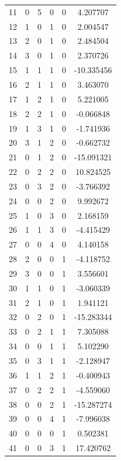 \documentclass[preprint,12pt]{elsarticle}
\begin{document}
\begin{table}
\begin{minipage}[!h]{0.25\textwidth}
{\begin{tabular}{|c|cccc|c|}
11  &   0 &   5 &   0 &   0 &    4.207707 \\
12  &   1 &   0 &   1 &   0 &    2.004547 \\
13  &   2 &   0 &   1 &   0 &    2.484504 \\
14  &   3 &   0 &   1 &   0 &    2.370726 \\
15  &   1 &   1 &   1 &   0 &  -10.335456 \\
16  &   2 &   1 &   1 &   0 &    3.463070 \\
17  &   1 &   2 &   1 &   0 &    5.221005 \\
18  &   2 &   2 &   1 &   0 &   -0.066848 \\
19  &   1 &   3 &   1 &   0 &   -1.741936 \\
20  &   3 &   1 &   2 &   0 &   -0.662732 \\
21  &   0 &   1 &   2 &   0 &  -15.091321 \\
22  &   0 &   2 &   2 &   0 &   10.824525 \\
23  &   0 &   3 &   2 &   0 &   -3.766392 \\
24  &   0 &   0 &   2 &   0 &    9.992672 \\
25  &   1 &   0 &   3 &   0 &    2.168159 \\
26  &   1 &   1 &   3 &   0 &   -4.415429 \\
27  &   0 &   0 &   4 &   0 &    4.140158 \\
28  &   2 &   0 &   0 &   1 &   -4.118752 \\
29  &   3 &   0 &   0 &   1 &    3.556601 \\
30  &   1 &   1 &   0 &   1 &   -3.060339 \\
31  &   2 &   1 &   0 &   1 &    1.941121 \\
32  &   0 &   2 &   0 &   1 &  -15.283344 \\
33  &   0 &   2 &   1 &   1 &    7.305088 \\
34  &   0 &   0 &   1 &   1 &    5.102290 \\
35  &   0 &   3 &   1 &   1 &   -2.128947 \\
36  &   1 &   1 &   2 &   1 &   -0.400943 \\
37  &   0 &   2 &   2 &   1 &   -4.559060 \\
38  &   0 &   0 &   2 &   1 &  -15.287274 \\
39  &   0 &   0 &   4 &   1 &   -7.996038 \\
40  &   0 &   0 &   0 &   1 &    0.502381 \\
41  &   0 &   0 &   3 &   1 &   17.420762 \\

\end{tabular}}
\end{minipage}
\end{table}
\end{document}
